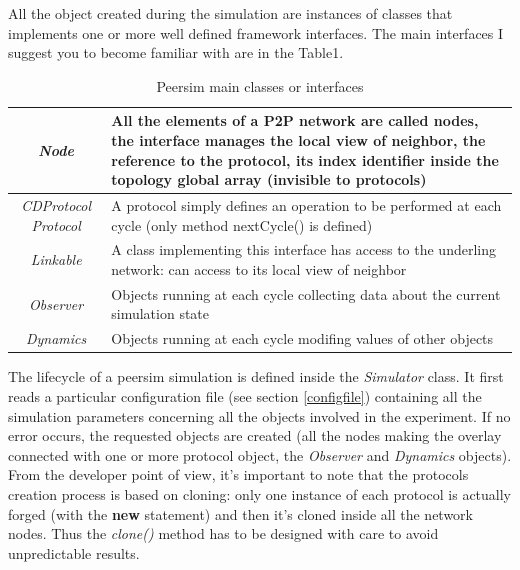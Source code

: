 \documentclass[a4paper,11pt]{article}
\begin{document}
All the object created during the simulation are instances of classes
that implements one or more well defined framework interfaces. The
main interfaces I suggest you to become familiar with are in the Table1. 

\label{table1}%
\begin{table}
\begin{center}\begin{tabular}{|c|p{2.5in}|}
\hline 
\emph{Node}&
All the elements of a P2P network are called nodes, the interface
manages the local view of neighbor, the reference to the protocol,
its index identifier inside the topology global array (invisible to
protocols)\\
\hline 
\emph{CDProtocol Protocol}&
A protocol simply defines an operation to be performed at each cycle
(only method nextCycle() is defined)\\
\hline 
\emph{Linkable}&
A class implementing this interface has access to the underling network:
can access to its local view of neighbor\\
\hline 
\emph{Observer}&
Objects running at each cycle collecting data about the current simulation
state\\
\hline 
\emph{Dynamics}&
Objects running at each cycle modifing values of other objects\\
\hline
\end{tabular}\end{center}


\caption{Peersim main classes or interfaces}
\end{table}


The lifecycle of a peersim simulation is defined inside the \emph{Simulator}
class. It first reads a particular configuration file (see section 
\ref{configfile}) containing all the simulation parameters 
concerning all the
objects involved in the experiment. If no error occurs, the requested
objects are created (all the nodes making the overlay connected with
one or more protocol object, the \emph{Observer} and
\emph{Dynamics} objects).
From the developer point of view, it's important to note that the
protocols creation process is based on cloning: only one instance
of each protocol is actually forged (with the \textbf{new} statement)
and then it's cloned inside all the network nodes. Thus the 
\emph{clone()} method has to be designed with care to avoid 
unpredictable results.
\end{document}
